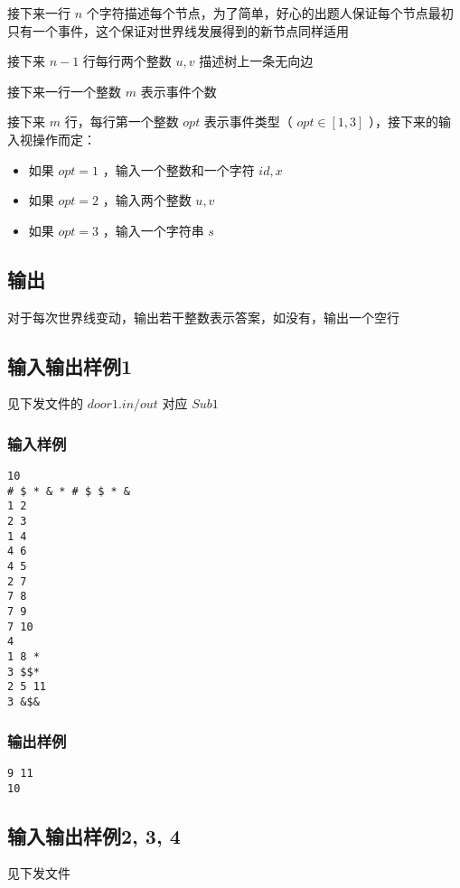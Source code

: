 \documentclass[UTF8]{ctexart}
\begin{document}
接下来一行 $n$ 个字符描述每个节点，为了简单，好心的出题人保证每个节点最初只有一个事件，这个保证对世界线发展得到的新节点同样适用

接下来 $n - 1$ 行每行两个整数 $u, v$ 描述树上一条无向边

接下来一行一个整数 $m$ 表示事件个数

接下来 $m$ 行，每行第一个整数 $opt$ 表示事件类型（ $opt \in [1, 3]$ ），接下来的输入视操作而定：

\begin{itemize}
    \item 如果 $opt = 1$ ，输入一个整数和一个字符 $id, x$ 
    \item 如果 $opt = 2$ ，输入两个整数 $u, v$ 
    \item 如果 $opt = 3$ ，输入一个字符串 $s$ 
\end{itemize}

\subsection{输出}

对于每次世界线变动，输出若干整数表示答案，如没有，输出一个空行
 
\subsection{输入输出样例1}

见下发文件的 $door1.in/out$ 对应 $Sub1$ 

\subsubsection{输入样例}

\begin{verbatim}
10
# $ * & * # $ $ * &
1 2
2 3
1 4
4 6
4 5
2 7
7 8
7 9
7 10
4
1 8 *
3 $$*
2 5 11
3 &$&
\end{verbatim}

\subsubsection{输出样例}
\begin{verbatim}
9 11 
10 
\end{verbatim}

\subsection{输入输出样例2, 3, 4}
见下发文件
 
\end{document}
